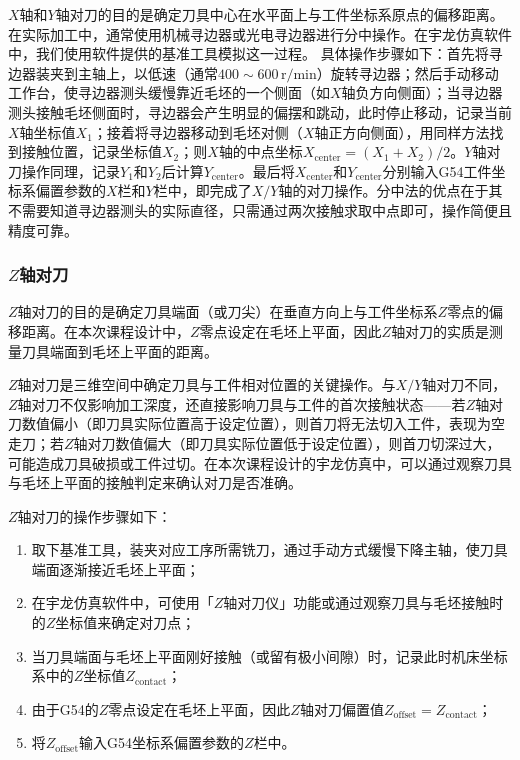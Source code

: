 \documentclass{xautCADreport}
\begin{document}
$X$轴和$Y$轴对刀的目的是确定刀具中心在水平面上与工件坐标系原点的偏移距离。在实际加工中，通常使用机械寻边器或光电寻边器进行分中操作。在宇龙仿真软件中，我们使用软件提供的基准工具模拟这一过程。
具体操作步骤如下：首先将寻边器装夹到主轴上，以低速（通常$400\sim600\,\mathrm{r/min}$）旋转寻边器；然后手动移动工作台，使寻边器测头缓慢靠近毛坯的一个侧面（如$X$轴负方向侧面）；当寻边器测头接触毛坯侧面时，寻边器会产生明显的偏摆和跳动，此时停止移动，记录当前$X$轴坐标值$X_1$；接着将寻边器移动到毛坯对侧（$X$轴正方向侧面），用同样方法找到接触位置，记录坐标值$X_2$；则$X$轴的中点坐标$X_{\mathrm{center}} = (X_1 + X_2)/2$。$Y$轴对刀操作同理，记录$Y_1$和$Y_2$后计算$Y_{\mathrm{center}}$。最后将$X_{\mathrm{center}}$和$Y_{\mathrm{center}}$分别输入G54工件坐标系偏置参数的$X$栏和$Y$栏中，即完成了$X/Y$轴的对刀操作。分中法的优点在于其不需要知道寻边器测头的实际直径，只需通过两次接触求取中点即可，操作简便且精度可靠。


\subsubsection{$Z$轴对刀}

$Z$轴对刀的目的是确定刀具端面（或刀尖）在垂直方向上与工件坐标系$Z$零点的偏移距离。在本次课程设计中，$Z$零点设定在毛坯上平面，因此$Z$轴对刀的实质是测量刀具端面到毛坯上平面的距离。

$Z$轴对刀是三维空间中确定刀具与工件相对位置的关键操作。与$X/Y$轴对刀不同，$Z$轴对刀不仅影响加工深度，还直接影响刀具与工件的首次接触状态——若$Z$轴对刀数值偏小（即刀具实际位置高于设定位置），则首刀将无法切入工件，表现为空走刀；若$Z$轴对刀数值偏大（即刀具实际位置低于设定位置），则首刀切深过大，可能造成刀具破损或工件过切。在本次课程设计的宇龙仿真中，可以通过观察刀具与毛坯上平面的接触判定来确认对刀是否准确。


$Z$轴对刀的操作步骤如下：

\begin{enumerate}
  \item 取下基准工具，装夹对应工序所需铣刀，通过手动方式缓慢下降主轴，使刀具端面逐渐接近毛坯上平面；
  \item 在宇龙仿真软件中，可使用「$Z$轴对刀仪」功能或通过观察刀具与毛坯接触时的$Z$坐标值来确定对刀点；
  \item 当刀具端面与毛坯上平面刚好接触（或留有极小间隙）时，记录此时机床坐标系中的$Z$坐标值$Z_{\text{contact}}$；
  \item 由于G54的$Z$零点设定在毛坯上平面，因此$Z$轴对刀偏置值$Z_{\text{offset}} = Z_{\text{contact}}$；
  \item 将$Z_{\text{offset}}$输入G54坐标系偏置参数的$Z$栏中。
\end{enumerate}
\end{document}

